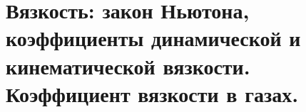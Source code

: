 \section{\normalsize Вязкость: закон Ньютона, коэффициенты динамической и кинематической вязкости. Коэффициент вязкости в газах.}